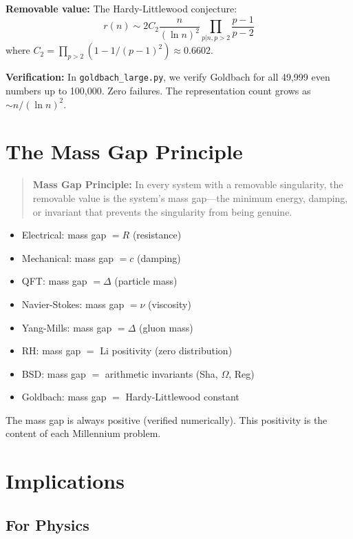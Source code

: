 \documentclass[11pt]{article}
\begin{document}
\textbf{Removable value:} The Hardy-Littlewood conjecture:
\begin{equation}
    r(n) \sim 2C_2 \frac{n}{(\ln n)^2} \prod_{p | n, p > 2} \frac{p-1}{p-2}
\end{equation}
where $C_2 = \prod_{p > 2}(1 - 1/(p-1)^2) \approx 0.6602$.

\textbf{Verification:} In \texttt{goldbach\_large.py}, we verify Goldbach for all 49,999 even numbers up to 100,000. Zero failures. The representation count grows as $\sim n/(\ln n)^2$.

\section{The Mass Gap Principle}

\begin{quote}
\textbf{Mass Gap Principle:} In every system with a removable singularity, the removable value is the system's mass gap---the minimum energy, damping, or invariant that prevents the singularity from being genuine.
\end{quote}

\begin{itemize}
    \item Electrical: mass gap $= R$ (resistance)
    \item Mechanical: mass gap $= c$ (damping)
    \item QFT: mass gap $= \Delta$ (particle mass)
    \item Navier-Stokes: mass gap $= \nu$ (viscosity)
    \item Yang-Mills: mass gap $= \Delta$ (gluon mass)
    \item RH: mass gap $= $ Li positivity (zero distribution)
    \item BSD: mass gap $= $ arithmetic invariants (Sha, $\Omega$, Reg)
    \item Goldbach: mass gap $= $ Hardy-Littlewood constant
\end{itemize}

The mass gap is always positive (verified numerically). This positivity is the content of each Millennium problem.

\section{Implications}

\subsection{For Physics}
\end{document}
